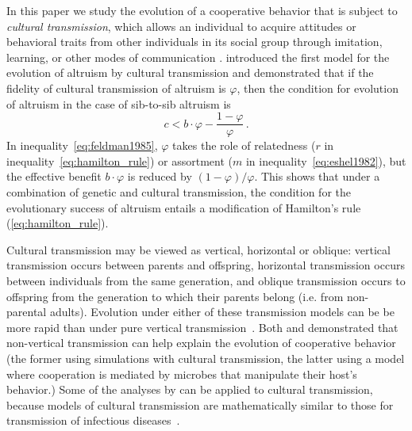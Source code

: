 \documentclass[12pt]{extarticle}
\begin{document}
In this paper we study the evolution of a cooperative behavior that is subject to \emph{cultural transmission}, which allows an individual to acquire attitudes or behavioral traits from other individuals in its social group through imitation, learning, or other modes of communication \citep{cavalli1981cultural,richerson2008not}.
\citet{feldman1985gene} introduced the first model for the evolution of altruism by cultural transmission and demonstrated that if the fidelity of cultural transmission of altruism is $\varphi$, then the condition for evolution of altruism in the case of sib-to-sib altruism is \citep[Eq.~16]{feldman1985gene}
\begin{equation} \label{eq:feldman1985}
c < b \cdot \varphi - \frac{1-\varphi}{\varphi} \,.
\end{equation}
In inequality~\ref{eq:feldman1985}, $\varphi$ takes the role of relatedness ($r$ in inequality~\ref{eq:hamilton_rule}) or assortment ($m$ in inequality~\ref{eq:eshel1982}), but the effective benefit $b\cdot \varphi$ is  reduced by $(1-\varphi)/\varphi$. This shows that under a combination of genetic and cultural transmission, the condition for the evolutionary success of altruism entails a modification of Hamilton's rule (\ref{eq:hamilton_rule}).

Cultural transmission may be  viewed as vertical, horizontal or oblique:  vertical transmission occurs between parents and offspring, horizontal transmission occurs between individuals from the same generation, and oblique transmission occurs  to offspring from the generation to which their parents belong (i.e. from non-parental adults). 
Evolution under either of these transmission models can be be more rapid than under pure vertical transmission~\citep{cavalli1981cultural,lycett2008questions,ram2018evolution}.
Both \citet{woodcock2006significance} and \citet{lewin2017microbes} demonstrated that non-vertical transmission can help explain the evolution of cooperative behavior (the former using simulations with cultural transmission, the latter using a model where cooperation is mediated by microbes that manipulate their host's behavior.) 
Some of the analyses by \citet{lewin2017microbes} can be applied to cultural transmission, because models of cultural transmission are mathematically similar to those for transmission of infectious diseases~\citep{cavalli1981cultural}.
\end{document}
